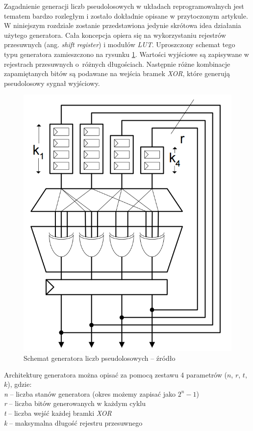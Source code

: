Zagadnienie generacji liczb pseudolosowych w układach reprogramowalnych jest tematem bardzo rozległym i zostało dokładnie opisane w przytoczonym artykule. 
W niniejszym rozdziale zostanie przedstawiona jedynie skrótowa idea działania użytego generatora. 
Cała koncepcja opiera się na wykorzystaniu rejestrów przesuwnych (ang. \textit{shift register}) i modułów \textit{LUT}. 
Uproszczony schemat tego typu generatora zamieszczono na rysunku \ref{fig:fpga_rng}. 
Wartości wyjściowe są zapisywane w rejestrach przesuwnych o~różnych długościach. 
Następnie różne kombinacje zapamiętanych bitów są podawane na wejścia bramek \textit{XOR}, które generują pseudolosowy sygnał wyjściowy.

	\begin{figure}[h!]
        \centering
		\includegraphics[scale=0.3]{img/4/rng_scheme.png}
		\caption{Schemat generatora liczb pseudolosowych -- źródło \cite{thomas_10}}
		\label{fig:fpga_rng}
	\end{figure}

Architekturę generatora można opisać za pomocą zestawu 4 parametrów ($n$, $r$, $t$, $k$), gdzie:\\
\-\hspace{1cm} \textit{n} -- liczba stanów generatora (okres możemy zapisać jako $2^n-1$)\\
\-\hspace{1cm} \textit{r} -- liczba bitów generowanych w każdym cyklu\\
\-\hspace{1cm} \textit{t} -- liczba wejść każdej bramki \textit{XOR}\\
\-\hspace{1cm} \textit{k} -- maksymalna długość rejestru przesuwnego\\

